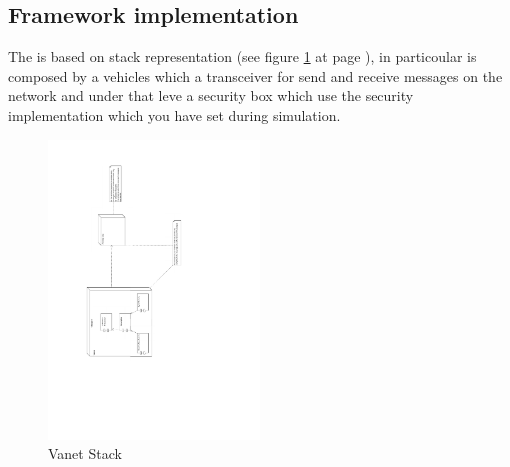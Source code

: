 \subsection{Framework implementation}
The \vs is based on stack representation (see figure \ref{fig:vanet_stack} at page \pageref{fig:vanet_stack}), in particoular is composed by a vehicles which a transceiver for send and receive messages on the network and under that leve a security box which use the security implementation which you have set during simulation.
\begin{figure}[ht]
\centerline{\includegraphics[width=0.5\textwidth, angle=-90]{vanet_stack.pdf}}
\caption{Vanet Stack}
\label{fig:vanet_stack}
\end{figure}

